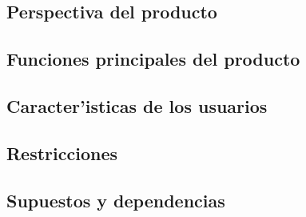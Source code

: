  \subsection{ Perspectiva del producto	}
 \subsection{ Funciones principales del producto 	}
 \subsection{ Caracter'isticas de los usuarios	}
 \subsection{ Restricciones	}
 \subsection{ Supuestos y dependencias	}
